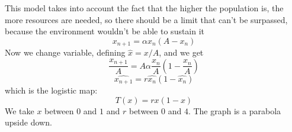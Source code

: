 This model takes into account the fact that the higher the population is, the more resources are needed, so there should be a limit that can't be surpassed, because the environment wouldn't be able to sustain it
$$
	x_{n+1} = \alpha x_n(A-x_n)
$$
Now we change variable, defining $\hat{x} = x/A$, and we get
$$
	\frac{x_{n+1}}{A} = A\alpha \frac{x_n}{A}\left(1 - \frac{x_n}{A}\right)
$$
$$
	\hat{x_{n+1}} = r \hat{x_n}(1-\hat{x_n})
$$
which is the logistic map:
$$
	T(x) = rx(1-x)
$$
We take $x$ between $0$ and $1$ and $r$ between $0$ and $4$. The graph is a parabola upside down.
